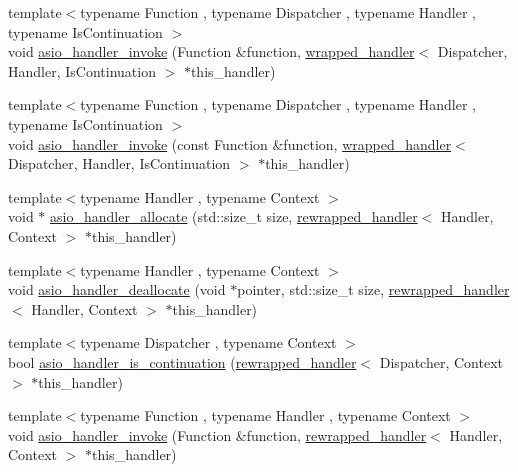 \begin{DoxyCompactItemize}
\item 
{\footnotesize template$<$typename Function , typename Dispatcher , typename Handler , typename Is\+Continuation $>$ }\\void \hyperlink{namespaceasio_1_1detail_a126d6bc00d6efc25531d658e982042f1}{asio\+\_\+handler\+\_\+invoke} (Function \&function, \hyperlink{classasio_1_1detail_1_1wrapped__handler}{wrapped\+\_\+handler}$<$ Dispatcher, Handler, Is\+Continuation $>$ $\ast$this\+\_\+handler)
\item 
{\footnotesize template$<$typename Function , typename Dispatcher , typename Handler , typename Is\+Continuation $>$ }\\void \hyperlink{namespaceasio_1_1detail_af1af74dc6afece196945e16589dba50a}{asio\+\_\+handler\+\_\+invoke} (const Function \&function, \hyperlink{classasio_1_1detail_1_1wrapped__handler}{wrapped\+\_\+handler}$<$ Dispatcher, Handler, Is\+Continuation $>$ $\ast$this\+\_\+handler)
\item 
{\footnotesize template$<$typename Handler , typename Context $>$ }\\void $\ast$ \hyperlink{namespaceasio_1_1detail_aaa9a9f0a042f74b7c011a91eafa7680e}{asio\+\_\+handler\+\_\+allocate} (std\+::size\+\_\+t size, \hyperlink{classasio_1_1detail_1_1rewrapped__handler}{rewrapped\+\_\+handler}$<$ Handler, Context $>$ $\ast$this\+\_\+handler)
\item 
{\footnotesize template$<$typename Handler , typename Context $>$ }\\void \hyperlink{namespaceasio_1_1detail_abe974a9fad4e0229e2e671801189ede0}{asio\+\_\+handler\+\_\+deallocate} (void $\ast$pointer, std\+::size\+\_\+t size, \hyperlink{classasio_1_1detail_1_1rewrapped__handler}{rewrapped\+\_\+handler}$<$ Handler, Context $>$ $\ast$this\+\_\+handler)
\item 
{\footnotesize template$<$typename Dispatcher , typename Context $>$ }\\bool \hyperlink{namespaceasio_1_1detail_a410cd1cfdd01d46d39bf59ea30465854}{asio\+\_\+handler\+\_\+is\+\_\+continuation} (\hyperlink{classasio_1_1detail_1_1rewrapped__handler}{rewrapped\+\_\+handler}$<$ Dispatcher, Context $>$ $\ast$this\+\_\+handler)
\item 
{\footnotesize template$<$typename Function , typename Handler , typename Context $>$ }\\void \hyperlink{namespaceasio_1_1detail_a8b5adbb88ebd6564c55d3c2cb0faafe3}{asio\+\_\+handler\+\_\+invoke} (Function \&function, \hyperlink{classasio_1_1detail_1_1rewrapped__handler}{rewrapped\+\_\+handler}$<$ Handler, Context $>$ $\ast$this\+\_\+handler)

\end{DoxyCompactItemize}
